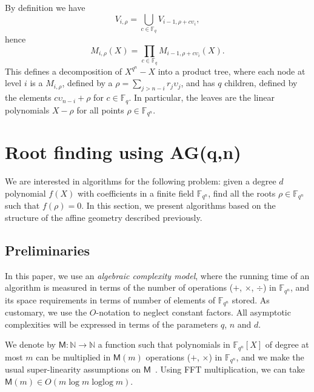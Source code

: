 \documentclass{sig-alternate}
\newcommand{\ff}[1]{\mathbb{F}_{#1}}
\newcommand{\dd}{d}
\newcommand{\qq}{q}
\newcommand{\nn}{n}
\newcommand{\qn}{{\qq^\nn}}
\newcommand{\basef}{\ff{\qq}}
\newcommand{\extf}{\ff{\qn}}
\newcommand{\AG}{\mathrm{AG}(\qq,\nn)}
\DeclareMathOperator{\loglog}{loglog}
\newcommand{\bigO}{O}
\newcommand{\Mul}{\mathsf{M}}
\newcounter{algo}
\renewcommand{\paragraph}[1]{\smallskip\noindent{{\bf \rm #1.}}}
\begin{document}
By definition we have
\begin{equation}
  V_{i,\rho} = \bigcup_{c\in\basef} V_{i-1,\rho + c\upsilon_i},
\end{equation}
hence
\begin{equation}
\label{node_product}
  M_{i,\rho}(X) = \prod_{c\in\basef} M_{i-1,\rho+c\upsilon_i}(X).
\end{equation}
This defines a decomposition of $X^{\qn}-X$ into a product tree, where
each node at level $i$ is a $M_{i,\rho}$, defined by a
$\rho=\sum_{j>n-i}r_j\upsilon_j$, and has $\qq$ children, defined by
the elements $c\upsilon_{n-i}+\rho$ for $c\in\basef$. In particular,
the leaves are the linear polynomials $X-\rho$ for all points
$\rho\in\extf$.



\section{Root finding using  AG(\qq,\nn)}
\label{sec:arm-sra}


We are interested in algorithms for the following problem: given a
degree $\dd$ polynomial $f(X)$ with coefficients in a finite field
$\extf$, find all the roots $\rho\in\extf$ such that $f(\rho)=0$.  In
this section, we present algorithms based on the structure of the
affine geometry described previously.

\subsection{Preliminaries}

\paragraph{Complexity notations} In this paper, we use an
\emph{algebraic complexity model}, where the running time of an
algorithm is measured in terms of the number of operations ($+$,
$\times$, $\div$) in $\extf$, and its space requirements in terms of
number of elements of $\extf$ stored. As customary, we use the
$\bigO$-notation to neglect constant factors. All asymptotic
complexities will be expressed in terms of the parameters $\qq$, $\nn$
and $\dd$.

We denote by $\Mul : \mathbb{N} \to \mathbb{N}$ a function such that
polynomials in $\extf[X]$ of degree at most $m$ can be multiplied in
$\Mul(m)$ operations ($+$, $\times$) in $\extf$, and we make the
usual super-linearity assumptions on
$\Mul$~\cite[Chapter~8]{Gathen2003}.  Using FFT multiplication, we can
take $\Mul(m)\in\bigO(m \log m \loglog m)$.
\end{document}
